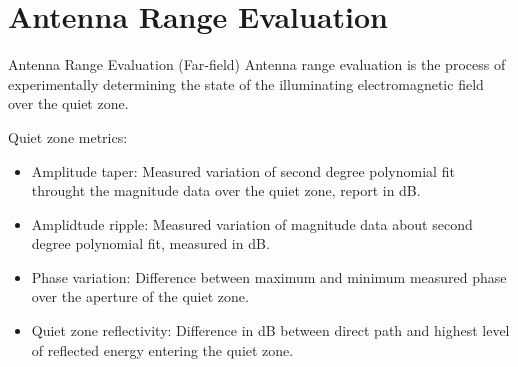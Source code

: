 \section{Antenna Range Evaluation}
\begin{definition}{Antenna Range Evaluation}
  (Far-field) Antenna range evaluation is the process of experimentally determining the state of the illuminating electromagnetic field over the quiet zone.
\end{definition}

Quiet zone metrics:
\begin{itemize}
  \item Amplitude taper: Measured variation of second degree polynomial fit throught the magnitude data over the quiet zone, report in dB.
  \item Amplidtude ripple: Measured variation of magnitude data about second degree polynomial fit, measured in dB.
  \item Phase variation: Difference between maximum and minimum measured phase over the aperture of the quiet zone.
  \item Quiet zone reflectivity: Difference in dB between direct path and highest level of reflected energy entering the quiet zone.
\end{itemize}
